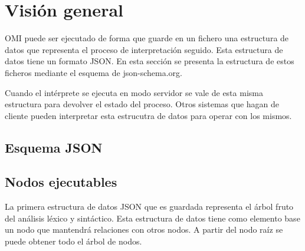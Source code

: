 \section{Visión general}
OMI puede ser ejecutado de forma que guarde en un fichero una estructura de datos que representa el proceso de interpretación seguido. 
Esta estructura de datos tiene un formato JSON. En esta sección se presenta la estructura de estos ficheros mediante el esquema de 
json-schema.org.

Cuando el intérprete se ejecuta en modo servidor se vale de esta misma estructura para devolver el estado del proceso. Otros sistemas
que hagan de cliente pueden interpretar esta estrucutra de datos para operar con los mismos. 
\subsection{Esquema JSON}

\subsection{Nodos ejecutables}
La primera estructura de datos JSON que es guardada representa el árbol fruto del análisis léxico y sintáctico. Esta estructura de datos tiene como elemento
base un nodo que mantendrá relaciones con otros nodos. A partir del nodo raíz se puede obtener todo el árbol de nodos.


